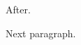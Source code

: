 \documentclass{article}
\begin{document}
\edef\x{\@firstoffive{a}}
After.

Next paragraph.
\end{document}
